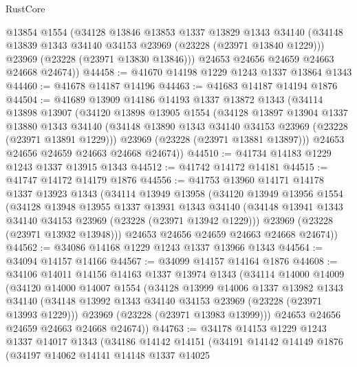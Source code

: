 \begin{lexlean}{RustCore}
\begin{coremodule}
        @13854
        @1554
        (@34128
          @13846
          @13853
          @1337
          @13829
          @1343
          @34140
          (@34148 @13839 @1343 @34140 @34153 @23969 (@23228 (@23971 @13840 @1229)))
          @23969
          (@23228 (@23971 @13830 @13846)))
        @24653
        @24656
        @24659
        @24663
        @24668
        @24674))
@44458 := @41670 @14198 @1229 @1243 @1337 @13864 @1343
@44460 := @41678 @14187 @14196
@44463 := @41683 @14187 @14194 @1876
@44504 := @41689
    @13909
    @14186
    @14193
    @1337
    @13872
    @1343
    (@34114
      @13898
      @13907
      (@34120
        @13898
        @13905
        @1554
        (@34128
          @13897
          @13904
          @1337
          @13880
          @1343
          @34140
          (@34148 @13890 @1343 @34140 @34153 @23969 (@23228 (@23971 @13891 @1229)))
          @23969
          (@23228 (@23971 @13881 @13897)))
        @24653
        @24656
        @24659
        @24663
        @24668
        @24674))
@44510 := @41734 @14183 @1229 @1243 @1337 @13915 @1343
@44512 := @41742 @14172 @14181
@44515 := @41747 @14172 @14179 @1876
@44556 := @41753
    @13960
    @14171
    @14178
    @1337
    @13923
    @1343
    (@34114
      @13949
      @13958
      (@34120
        @13949
        @13956
        @1554
        (@34128
          @13948
          @13955
          @1337
          @13931
          @1343
          @34140
          (@34148 @13941 @1343 @34140 @34153 @23969 (@23228 (@23971 @13942 @1229)))
          @23969
          (@23228 (@23971 @13932 @13948)))
        @24653
        @24656
        @24659
        @24663
        @24668
        @24674))
@44562 := @34086 @14168 @1229 @1243 @1337 @13966 @1343
@44564 := @34094 @14157 @14166
@44567 := @34099 @14157 @14164 @1876
@44608 := @34106
    @14011
    @14156
    @14163
    @1337
    @13974
    @1343
    (@34114
      @14000
      @14009
      (@34120
        @14000
        @14007
        @1554
        (@34128
          @13999
          @14006
          @1337
          @13982
          @1343
          @34140
          (@34148 @13992 @1343 @34140 @34153 @23969 (@23228 (@23971 @13993 @1229)))
          @23969
          (@23228 (@23971 @13983 @13999)))
        @24653
        @24656
        @24659
        @24663
        @24668
        @24674))
@44763 := @34178
    @14153
    @1229
    @1243
    @1337
    @14017
    @1343
    (@34186
      @14142
      @14151
      (@34191
        @14142
        @14149
        @1876
        (@34197
          @14062
          @14141
          @14148
          @1337
          @14025

\end{coremodule}
\end{lexlean}

